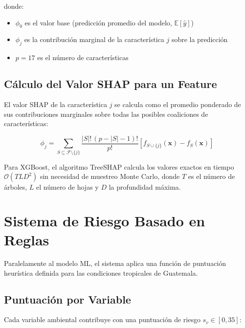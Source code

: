 \documentclass[12pt, a4paper]{article}
\begin{document}
donde:
\begin{itemize}[leftmargin=2cm]
  \item $\phi_0$ es el valor base (predicción promedio del modelo, $\mathbb{E}[\hat{y}]$)
  \item $\phi_j$ es la contribución marginal de la característica $j$ sobre la predicción
  \item $p = 17$ es el número de características
\end{itemize}

\subsection{Cálculo del Valor SHAP para un Feature}

El valor SHAP de la característica $j$ se calcula como el promedio ponderado de sus contribuciones marginales sobre todas las posibles coaliciones de características:

\begin{equation}
  \phi_j = \sum_{S \subseteq \mathcal{F} \setminus \{j\}} \frac{|S|!\,(p - |S| - 1)!}{p!}
    \left[ f_{S \cup \{j\}}(\mathbf{x}) - f_S(\mathbf{x}) \right]
  \label{eq:shap_formula}
\end{equation}

Para XGBoost, el algoritmo TreeSHAP calcula los valores exactos en tiempo $\mathcal{O}(TLD^2)$ sin necesidad de muestreo Monte Carlo, donde $T$ es el número de árboles, $L$ el número de hojas y $D$ la profundidad máxima.

\section{Sistema de Riesgo Basado en Reglas}

Paralelamente al modelo ML, el sistema aplica una función de puntuación heurística definida para las condiciones tropicales de Guatemala.

\subsection{Puntuación por Variable}

Cada variable ambiental contribuye con una puntuación de riesgo $s_v \in [0, 35]$:
\end{document}
